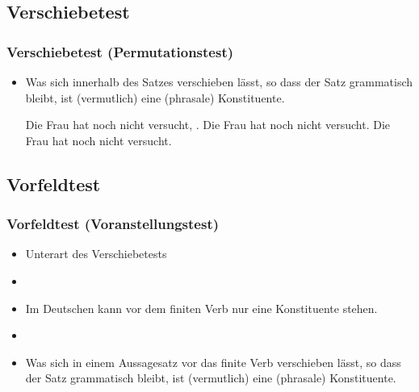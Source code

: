\subsection{Verschiebetest}

\begin{frame}
\frametitle{Verschiebetest (Permutationstest)}

\begin{itemize}
	\item Was sich innerhalb des Satzes verschieben lässt, so dass der Satz grammatisch bleibt, ist (vermutlich) eine (phrasale) Konstituente.

	\eal 
	\zl

\pause	
	\eal 
	\ex Die Frau hat noch nicht versucht, .
	\ex Die Frau hat  noch nicht versucht.
	\ex Die Frau hat noch nicht  versucht.
	\zl

\end{itemize}

\end{frame}


\subsection{Vorfeldtest}


\begin{frame}
\frametitle{Vorfeldtest (Voranstellungstest)}

\begin{itemize}
	\item Unterart des Verschiebetests
	\item[]
	\item Im Deutschen kann vor dem finiten Verb nur eine Konstituente stehen. 
	\item[]
	\item Was sich in einem Aussagesatz vor das finite Verb verschieben lässt, so dass der Satz grammatisch bleibt, ist (vermutlich) eine (phrasale) Konstituente.

\end{itemize}

\end{frame}


